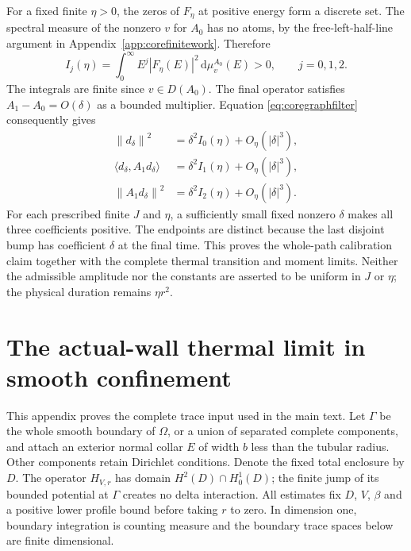 \documentclass[aps,pra,reprint,superscriptaddress,longbibliography]{revtex4-2}
\newcommand{\dd}{\mathrm d}
\newcommand{\norm}[1]{\left\lVert#1\right\rVert}
\begin{document}
For a fixed finite $\eta>0$, the zeros of $F_\eta$ at positive
energy form a discrete set. The spectral measure of the nonzero
$v$ for $A_0$ has no atoms, by the free-left-half-line argument in
Appendix~\ref{app:corefinitework}. Therefore
\begin{equation}
 I_j(\eta)=\int_0^\infty
 E^j|F_\eta(E)|^2\,\dd\mu_v^{A_0}(E)>0,
 \qquad j=0,1,2.
 \label{eq:corepositivefilteredmoments}
\end{equation}
The integrals are finite since $v\in D(A_0)$. The final operator
satisfies $A_1-A_0=O(\delta)$ as a bounded multiplier. Equation
\eqref{eq:coregraphfilter} consequently gives
\begin{align}
 \norm{d_\delta}^2
     &=\delta^2I_0(\eta)+O_\eta(|\delta|^3),\nonumber\\
 \langle d_\delta,A_1d_\delta\rangle
     &=\delta^2I_1(\eta)+O_\eta(|\delta|^3),\nonumber\\
 \norm{A_1d_\delta}^2
     &=\delta^2I_2(\eta)+O_\eta(|\delta|^3).
 \label{eq:corepositivepathcoefficients}
\end{align}
For each prescribed finite $J$ and $\eta$, a sufficiently small
fixed nonzero $\delta$ makes all three coefficients positive.
The endpoints are distinct because the last disjoint bump has
coefficient $\delta$ at the final time. This proves the
whole-path calibration claim together with the complete thermal
transition and moment limits. Neither the admissible amplitude
nor the constants are asserted to be uniform in $J$ or $\eta$;
the physical duration remains $\eta r^2$.

\section{The actual-wall thermal limit in smooth confinement}
\label{app:geometry}

This appendix proves the complete trace input used in the main text. Let $\Gamma$ be the whole smooth boundary of $\Omega$, or a union of separated complete components, and attach an exterior normal collar $E$ of width $b$ less than the tubular radius. Other components retain Dirichlet conditions. Denote the fixed total enclosure by $D$. The operator $H_{V,r}$ has domain $H^2(D)\cap H_0^1(D)$; the finite jump of its bounded potential at $\Gamma$ creates no delta interaction. All estimates fix $D$, $V$, $\beta$ and a positive lower profile bound before taking $r$ to zero. In dimension one, boundary integration is counting measure and the boundary trace spaces below are finite dimensional.
\end{document}
